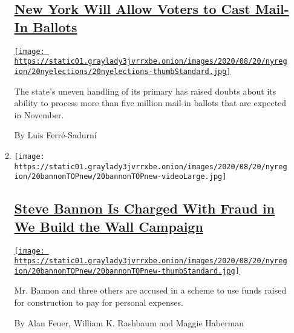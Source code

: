 \begin{enumerate}
\begin{enumerate}
    \hypertarget{new-york-will-allow-voters-to-cast-mail-in-ballots}{%
    \subsection{\texorpdfstring{\href{/2020/08/20/nyregion/vote-by-mail-new-york.html}{New
    York Will Allow Voters to Cast Mail-In
    Ballots}}{New York Will Allow Voters to Cast Mail-In Ballots}}\label{new-york-will-allow-voters-to-cast-mail-in-ballots}}

    \href{/2020/08/20/nyregion/vote-by-mail-new-york.html}{\texttt{[image: https://static01.graylady3jvrrxbe.onion/images/2020/08/20/nyregion/20nyelections/20nyelections-thumbStandard.jpg]}}

    The state's uneven handling of its primary has raised doubts about
    its ability to process more than five million mail-in ballots that
    are expected in November.

    By Luis Ferré-Sadurní
  \item
    \texttt{[image: https://static01.graylady3jvrrxbe.onion/images/2020/08/20/nyregion/20bannonTOPnew/20bannonTOPnew-videoLarge.jpg]}

    \hypertarget{steve-bannon-is-charged-with-fraud-in-we-build-the-wall-campaign}{%
    \subsection{\texorpdfstring{\href{/2020/08/20/nyregion/steve-bannon-arrested-indicted.html}{Steve
    Bannon Is Charged With Fraud in We Build the Wall
    Campaign}}{Steve Bannon Is Charged With Fraud in We Build the Wall Campaign}}\label{steve-bannon-is-charged-with-fraud-in-we-build-the-wall-campaign}}

    \href{/2020/08/20/nyregion/steve-bannon-arrested-indicted.html}{\texttt{[image: https://static01.graylady3jvrrxbe.onion/images/2020/08/20/nyregion/20bannonTOPnew/20bannonTOPnew-thumbStandard.jpg]}}

    Mr. Bannon and three others are accused in a scheme to use funds
    raised for construction to pay for personal expenses.

    By Alan Feuer, William K. Rashbaum and Maggie Haberman
  \end{enumerate}
\end{enumerate}

